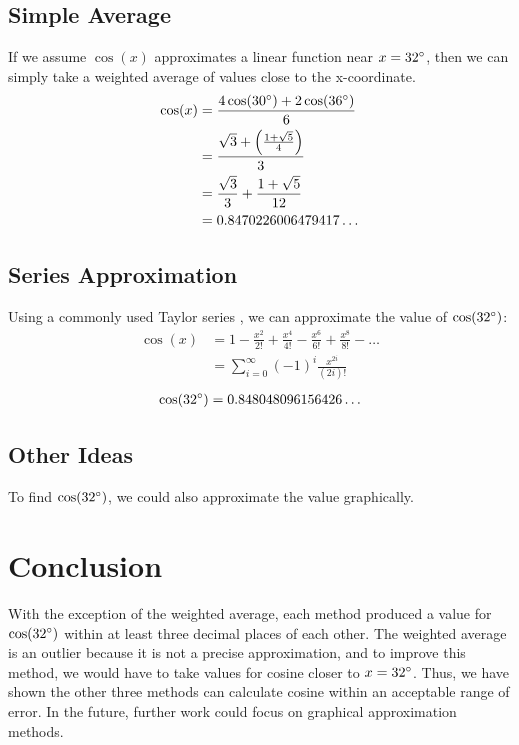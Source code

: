 \documentclass[12pt]{article}
\begin{document}
    \subsection{Simple Average}
      If we assume \(\cos(x)\) approximates a linear function near
      \(x = 32 \degree\), then we can simply take a weighted average of values
      close to the x-coordinate.
      \begin{equation}
        \begin{split}
          \cos(x) &= \frac{4\cos(30 \degree) + 2\cos(36 \degree)}{6} \\
            &= \frac{\sqrt{3} + \left(\frac{1 + \sqrt{5}}{4}\right)}{3} \\
            &= \frac{\sqrt{3}}{3} + \frac{1 + \sqrt{5}}{12} \\
            &= 0.8470226006479417 \ldots
        \end{split}
      \end{equation}

    \subsection{Series Approximation}
      Using a commonly used Taylor series \cite{taylorseries2015}, we can
      approximate the value of \(\cos(32 \degree)\):
      \begin{equation}
        \begin{split}
          \cos(x) &= 1 - \frac{x^2}{2!} + \frac{x^4}{4!} - \frac{x^6}{6!} +
              \frac{x^8}{8!} - \ldots \\
            &= \sum_{i=0}^{\infty} (-1)^{i} \frac{x^{2i}}{(2i)!}
        \end{split}
      \end{equation}
      \begin{align}
        \cos(32 \degree) = 0.848048096156426 \ldots
      \end{align}

    \subsection{Other Ideas}
      To find \(\cos(32 \degree)\), we could also approximate the value
        graphically.

  \section{Conclusion}
    With the exception of the weighted average, each method produced a value
    for \(\cos(32 \degree)\) within at least three decimal places of each
    other. The weighted average is an outlier because it is not a precise
    approximation, and to improve this method, we would have to take values for
    cosine closer to \(x = 32 \degree\). Thus, we have shown the other three
    methods can calculate cosine within an acceptable range of error. In the
    future, further work could focus on graphical approximation methods.

  \pagebreak

  
  
\end{document}
